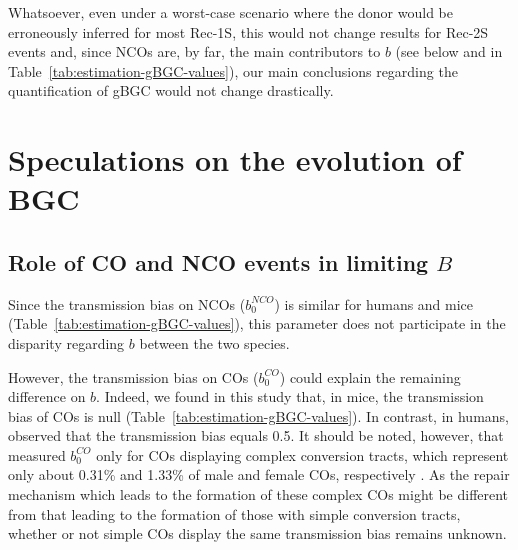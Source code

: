 Whatsoever, even under a worst-case scenario where the donor would be erroneously inferred for most Rec-1S, this would not change results for Rec-2S events and, since NCOs are, by far, the main contributors to $b$ (see below and in Table~\ref{tab:estimation-gBGC-values}), our main conclusions regarding the quantification of gBGC would not change drastically.










\section{Speculations on the evolution of BGC}
\subsection{Role of CO and NCO events in limiting $B$}



Since the transmission bias on NCOs ($b_0^{NCO}$) is similar for humans and mice (Table~\ref{tab:estimation-gBGC-values}), this parameter does not participate in the disparity regarding $b$ between the two species.

However, the transmission bias on COs ($b_0^{CO}$) could explain the remaining difference on $b$.
Indeed, we found in this study that, in mice, the transmission bias of COs is null (Table~\ref{tab:estimation-gBGC-values}).
In contrast, in humans, \citet{halldorsson2016rate} observed that the transmission bias equals 0.5.
It should be noted, however, that \citet{halldorsson2016rate} measured $b_0^{CO}$ only for COs displaying complex conversion tracts, which represent only about 0.31\% and 1.33\% of male and female COs, respectively \citep{webb2008sperm, halldorsson2016rate}.
As the repair mechanism which leads to the formation of these complex COs might be different from that leading to the formation of those with simple conversion tracts, whether or not simple COs display the same transmission bias remains unknown.

